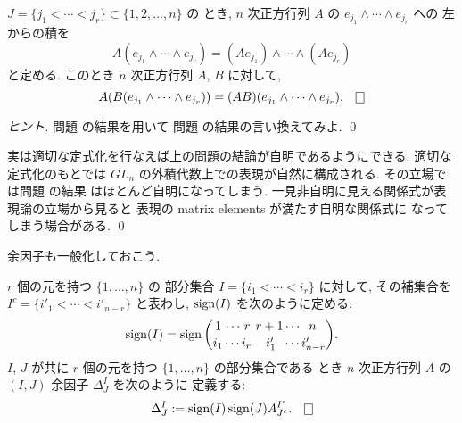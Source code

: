 \documentclass[12pt,twoside]{jarticle}
\begin{document}

\begin{question}
  $J=\{j_1<\cdots<j_r\}\subset\{1,2,\ldots,n\}$ の
  とき,  $n$ 次正方行列 $A$ の $e_{j_1}\wedge\cdots\wedge e_{j_r}$ への
  左からの積を
  \begin{equation*}
    A(e_{j_1}\wedge\cdots\wedge e_{j_r}) 
    = (Ae_{j_1})\wedge\cdots\wedge(Ae_{j_r})
  \end{equation*}
  と定める. このとき $n$ 次正方行列 $A$, $B$ に対して,
  \begin{equation*}
    A(B(e_{j_1}\wedge\cdots\wedge e_{j_r}))
    =(AB)(e_{j_1}\wedge\cdots\wedge e_{j_r}).
    \qed
  \end{equation*}
\end{question}

\begin{proof}[ヒント]
  問題  の結果を用いて
  問題  の結果の言い換えてみよ. 
  \qed
\end{proof}

\begin{guide}
  実は適切な定式化を行なえば上の問題の結論が自明であるようにできる.
  適切な定式化のもとでは $GL_n$ の外積代数上での表現が自然に構成される.
  その立場では問題  の結果
  はほとんど自明になってしまう.
  一見非自明に見える関係式が表現論の立場から見ると
  表現の matrix elements が満たす自明な関係式に
  なってしまう場合がある.
  \qed
\end{guide}


余因子も一般化しておこう.

\begin{definition}[余因子]
  \label{def:cofactor2}
  $r$ 個の元を持つ $\{1,\ldots,n\}$ の
  部分集合 $I=\{i_1<\cdots<i_r\}$ に対して, 
  その補集合を $I^c=\{i'_1<\cdots<i'_{n-r}\}$ と表わし,
  $\mathop{\mathrm{sign}}\nolimits(I)$ を次のように定める:
  \begin{equation*}
    \mathop{\mathrm{sign}}\nolimits(I) =
    \mathop{\mathrm{sign}}\nolimits\binom
    { 1\, \cdots \,r\;\,         r+1     \cdots \;\; n\;\;}
    { i_1  \cdots i_r\,   \;\;\;\,i'_1\;\; \cdots  i'_{n-r}  }.
  \end{equation*}
  $I$, $J$ が共に $r$ 個の元を持つ $\{1,\ldots,n\}$ の部分集合である
  とき $n$ 次正方行列 $A$ の $(I,J)$ 余因子 $\Delta^I_J$ を次のように
  定義する:
  \begin{equation*}
    \Delta^I_J := \sign(I)\sign(J) A^{I^c}_{J^c}.
    \qed
  \end{equation*}
\end{definition}
\end{document}

